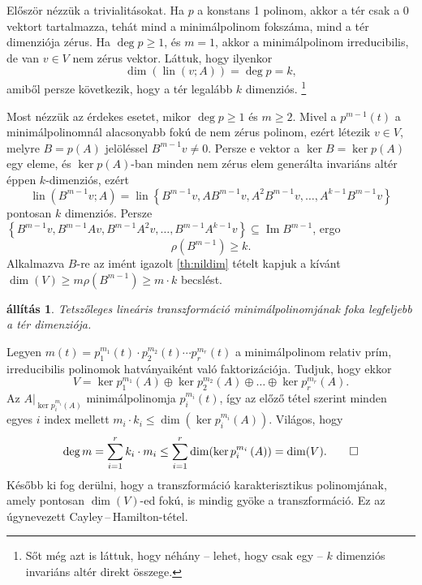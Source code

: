 \documentclass[a4paper, showtrims]{memoir}
\makeatletter
\renewenvironment{proof}[1][\proofname]
    {\par\pushQED{\qed}%
    \normalfont \topsep6\p@\@plus6\p@\relax
    \trivlist
    \item[\hskip\labelsep
        \itshape
    #1\@addpunct{:}]\ignorespaces}
    {\popQED\endtrivlist\@endpefalse}
\theoremstyle{plain}
\newtheorem{proposition}{állítás}[chapter]
\theoremstyle{remark}
\theoremstyle{definition}
\DeclareMathOperator{\lin}{lin}
\DeclareMathOperator{\im}{Im}
\makeatother
\begin{document}
\begin{proof}
	Először nézzük a trivialitásokat.
	Ha $p$ a konstans 1 polinom, akkor a tér csak a 0 vektort tartalmazza,
	tehát mind a minimálpolinom fokszáma, mind a tér dimenziója zérus.
	Ha $\deg p\geq 1$, és $m=1$, akkor a minimálpolinom irreducibilis,
	de van $v\in V$ nem zérus vektor.
	Láttuk, hogy ilyenkor
	\[
		\dim\left( \lin\left( v;A \right) \right)=\deg p=k,
	\]
	amiből persze következik, hogy a tér legalább $k$ dimenziós.
	\footnote{Sőt még azt is láttuk, hogy néhány -- lehet, hogy csak egy -- $k$ dimenziós invariáns altér direkt összege.}

	Most nézzük az érdekes esetet,
	mikor $\deg p\geq 1$ és $m\geq 2$.
	Mivel a
	\begin{math}
		p^{m-1}\left( t \right)
	\end{math}
	a minimálpolinomnál alacsonyabb fokú de nem zérus polinom,
	ezért létezik $v\in V$, melyre $B=p\left( A \right)$ jelöléssel
	\(
	B^{m-1}v\neq 0.
	\)
	Persze e vektor a $\ker B=\ker p\left( A \right)$
	egy eleme,
	és $\ker p\left( A \right)$-ban minden nem zérus elem generálta invariáns altér éppen $k$-dimenziós,
	ezért
	\[
		\lin(B^{m-1}v;A)=
		\lin\left\{
		B^{m-1}v,
		AB^{m-1}v,
		A^2B^{m-1}v,
		\ldots,
		A^{k-1}B^{m-1}v
		\right\}
	\]
	pontosan $k$ dimenziós.
	Persze $\left\{ B^{m-1}v,B^{m-1}Av,B^{m-1}A^2v,\ldots,B^{m-1}A^{k-1}v \right\}\subseteq \im B^{m-1}$,
	ergo
	\[
		\rho\left( B^{m-1}\right)\geq k.
	\]
	Alkalmazva $B$-re az imént igazolt \ref{th:nildim} tételt kapjuk a kívánt
	\(
	\dim(V)\geq m\rho\left( B^{m-1} \right)\geq m\cdot k
	\)
	becslést.
\end{proof}
\begin{proposition}
	Tetszőleges lineáris transzformáció minimálpolinomjának foka legfeljebb a tér dimenziója.
	\label{th:minpol}
\end{proposition}
\begin{proof}
	Legyen
	$
		m\left( t \right)
		=
		p_1^{m_1}\left( t \right)\cdot
		p_2^{m_2}\left( t \right)\cdots
		p_r^{m_r}\left( t \right)
	$
	a minimálpolinom relativ prím, irreducibilis polinomok hatványaiként való faktorizációja.
	Tudjuk, hogy ekkor
	\[
		V
		=
		\ker p_1^{m_1}\left( A \right)
		\oplus
		\ker p_2^{m_2}\left( A \right)
		\oplus\dots\oplus
		\ker p_r^{m_r}\left( A \right).
	\]
	Az $A|_{\ker p_i^{m_i}\left( A \right)}$ minimálpolinomja $p_i^{m_i}\left( t \right)$, így az előző tétel szerint minden egyes $i$ index mellett
	$
		m_i\cdot k_i\leq \dim(\ker p_i^{m_i}\left( A \right)).
	$
	Világos, hogy
	\[
		\deg m
		=
		\sum_{i=1}^rk_i\cdot m_i
		\leq
		\sum_{i=1}^r\dim(\ker p_i^{m_i}\left( A \right))
		=
		\dim(V).\qedhere
	\]
\end{proof}
Később ki fog derülni,
hogy a transzformáció karakterisztikus polinomjának, amely pontosan $\dim(V)$-ed fokú,
is mindig gyöke a transzformáció.
Ez az úgynevezett Cayley\,--\,Hamilton-tétel.
\end{document}
